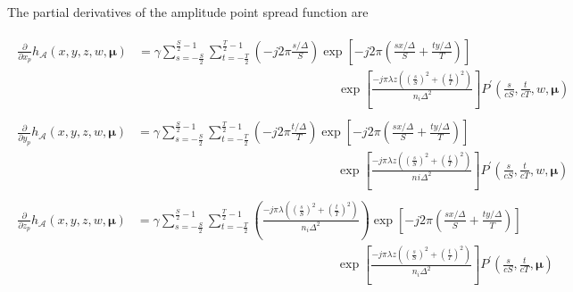 \documentclass[letter, 11pt]{article}
\begin{document}
\noindent
The partial derivatives of the amplitude point spread function are


\begin{align*}
	\begin{split}
		\frac{\partial}{\partial x_{p}}  h_{\mathcal{A}}(x, y, z, w, \boldsymbol{\mu}) &= 
		\gamma \sum\limits_{s = - \frac{S}{2} }^{\frac{S}{2} - 1} \sum\limits_{t = - \frac{T}{2} }^{\frac{T}{2} - 1} 
		\left( - j 2 \pi \frac{s / \Delta}{S} \right) \exp \left[ - j 2 \pi \left( \frac{s x / \Delta}{S} + 
		\frac{t y / \Delta }{T} \right) \right] \\
		&\qquad \qquad \qquad \qquad \qquad \qquad \qquad \qquad 
		\exp \left[ \frac{- j \pi \lambda z ( { \left( \frac{s}{S} \right) }^{2} + 
		{\left( \frac{t}{T} \right)}^{2} ) }{ n_{i} \Delta^{2} } \right] P^{\prime} {\left( \frac{s}{cS}, \frac{t}{cT}, w, \boldsymbol{\mu} \right)}
	\end{split} \\
	\begin{split}
		\frac{\partial}{\partial y_{p}} h_{\mathcal{A}} (x, y, z, w, \boldsymbol{\mu}) &=
		\gamma \sum\limits_{s = - \frac{S}{2} }^{\frac{S}{2} - 1} \sum\limits_{t = - \frac{T}{2} }^{\frac{T}{2} - 1} 
		\left( - j 2 \pi \frac{t / \Delta}{T} \right) \exp \left[ - j 2 \pi \left( \frac{s x / \Delta}{S} + 
		\frac{t y / \Delta }{T} \right) \right] \\
		&\qquad \qquad \qquad \qquad \qquad \qquad \qquad \qquad 
		\exp \left[ \frac{- j \pi \lambda z ( { \left( \frac{s}{S} \right) }^{2} + 
		{\left( \frac{t}{T} \right)}^{2} ) }{ n_{}i \Delta^{2} } \right] P^{\prime} {\left( \frac{s}{cS}, \frac{t}{cT}, w, \boldsymbol{\mu} \right)}
	\end{split} \\
	\begin{split}
		\frac{\partial}{\partial z_{p}} h_{\mathcal{A}}(x, y, z, w, \boldsymbol{\mu}) &=
		\gamma \sum\limits_{s = - \frac{S}{2} }^{\frac{S}{2} - 1} \sum\limits_{t = - \frac{T}{2} }^{\frac{T}{2} - 1} 
		\left( \frac{- j \pi \lambda ( { \left( \frac{s}{S} \right) }^{2} + {\left( \frac{t}{T} \right)}^2 )}{ n_{i} \Delta^2 } \right) \exp 
		\left[ - j 2 \pi \left( \frac{s x /\Delta}{S} + \frac{t y / \Delta }{T} \right) \right] \\
		&\qquad \qquad \qquad \qquad \qquad \qquad \qquad \qquad 
		\exp \left[ \frac{- j \pi \lambda z ( { \left( \frac{s}{S} \right) }^{2} + {\left( \frac{t}{T} \right)}^{2} ) }{ n_{i} \Delta^2 } \right] 
		P^{\prime} {\left( \frac{s}{cS}, \frac{t}{cT}, \boldsymbol{\mu} \right)} 

\end{split}
\end{align*}
\end{document}
